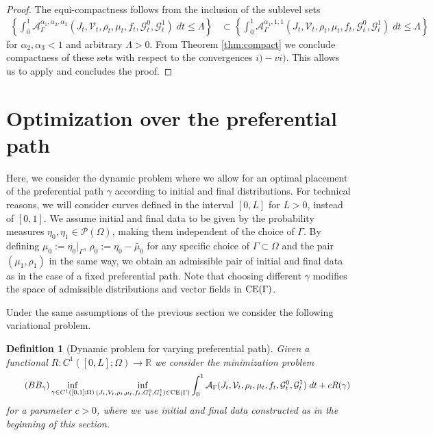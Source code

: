 \documentclass{article}
\def\R{{\mathbb R}}
\def\calA{{\mathcal A}} \def\calB{{\mathcal B}} \def\calC{{\mathcal C}}
\def\calG{{\mathcal G}} \def\calH{{\mathcal H}} \def\calI{{\mathcal I}}
\newtheorem{definition}[theorem]{Definition}
\begin{document}
\begin{proof}
    The equi-compactness follows from the inclusion of the sublevel sets
    \begin{align*}
    \left\{\int_{0}^{1} \calA_\Gamma^{\alpha_1, \alpha_2, \alpha_3}(J_t, \mathcal{V}_t, \rho_t, \mu_t, f_t, \calG_t^0, \calG_t^1)\; dt \leq \Lambda \right\}&\subset \left\{\int_{0}^{1} \calA_\Gamma^{\alpha_1, 1, 1}(J_t, \mathcal{V}_t, \rho_t, \mu_t, f_t, \calG_t^0, \calG_t^1)\; dt \leq \Lambda \right\}
    \end{align*}
    for $\alpha_2, \alpha_3 < 1$ and arbitrary $\Lambda>0$. From Theorem \ref{thm:compact} we conclude compactness of these sets with respect to the convergences $i) - vi)$. This allows us to apply \cite[Corollary 7.20]{dal2012introduction} and concludes the proof. 
\end{proof}




\section{Optimization over the preferential path}\label{OptPrefPath}

Here, we consider the dynamic problem where we allow for an optimal placement of the preferential path $\gamma$ according to initial and final distributions.
For technical reasons, we will consider curves defined in the interval $[0,L]$ for $L>0$, instead of $[0,1]$.
We assume initial and final data to be given by the probability measures $\eta_0, \eta_1 \in \mathcal{P}(\Omega)$, making them independent of the choice of $\Gamma$. By defining $\mu_0 := \eta_0 |_\Gamma$, $\rho_0 := \eta_0 - \bar \mu_0$ for any specific choice of $\Gamma\subset\Omega$ and the pair $(\mu_1, \rho_1)$ in the same way, we obtain an admissible pair of initial and final data as in the case of a fixed preferential path. 
Note that choosing different $\gamma$ modifies the space of admissible distributions and vector fields in $\rm CE (\Gamma)$. 


Under the same assumptions of the previous section we consider the following variational problem.
\begin{definition}[Dynamic problem for varying preferential path]
Given a functional $R:C^{1}([0,L];\Omega) \to \R$ we consider the minimization problem
\begin{align}\label{eq:BBgamma}\tag{$BB_\gamma$}
\inf_{\gamma \in C^{1}([0,1];\Omega)}\inf _{(J_t, V_t, \rho_t, \mu_t, f_t, G_t^0, G_t^1) \in {\rm CE(\Gamma)}}  \int_{0}^{1} \calA_\Gamma (J_t, \mathcal{V}_t, \rho_t, \mu_t, f_t, \mathcal{G}_t^0, \mathcal{G}_t^1)\;d t + c R(\gamma)
\end{align}
for a parameter $c>0$, where we use initial and final data constructed as in the beginning of this section. 
\end{definition}
\end{document}
